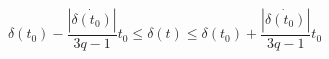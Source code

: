 \begin{equation}\label{condition}
\delta(t_0)-\frac{|\dot{\delta(t_0)}|}{3q-1}t_0\leq \delta(t)\leq
\delta(t_0)+\frac{|\dot{\delta(t_0)}|}{3q-1}t_0
\end{equation}

